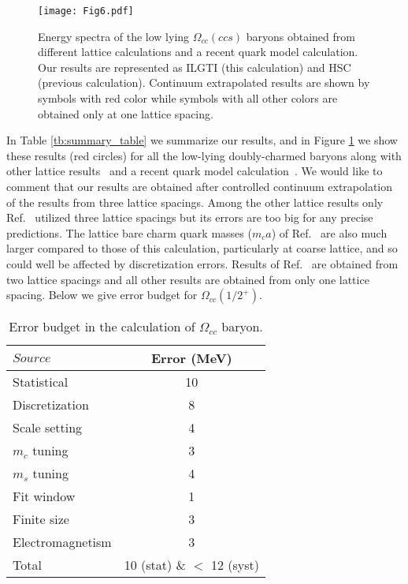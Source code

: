 \documentclass[showkeys,aps,twocolumn,showpacs,preprintnumbers,amsmath,amssymb,prl,letterpaper,floatfix,nofootinbib,superscriptaddress,]{revtex4-1}
\newcommand\bef{\begin{figure}}
\newcommand\eef[1]{\label{fg:#1}\end{figure}}
\newcommand\bet{\begin{table}}
\newcommand\eet[1]{\label{tb:#1}\end{table}}
\newcommand\fgn[1]{Figure \ref{fg:#1}}
\newcommand\tbn[1]{Table \ref{tb:#1}}
\begin{document}
{{\bef[tbh]
\centering
\texttt{[image: Fig6.pdf]}
\vspace*{-0.09in}
\caption{Energy spectra of the low lying $\Omega_{cc}(ccs)$ baryons obtained from different lattice calculations and a recent quark model calculation. Our results are represented as ILGTI (this calculation) and HSC (previous calculation). Continuum extrapolated results are shown by symbols with red color while symbols with all other colors are obtained only at one lattice spacing.}
\eef{fig_summary}

In \tbn{summary_table} we summarize our results, and in \fgn{fig_summary} we show these results (red circles) for all the low-lying doubly-charmed baryons along with other lattice results~\cite{Lewis:2001iz,Mathur:2002ce,Liu:2009jc,Briceno:2012wt,Basak:2012py,Basak:2013oya,Namekawa:2013vu,Brown:2014ena,Bali:2015lka,Padmanath:2015jea,Chen:2017kxr,Alexandrou:2017xwd,Mondal:2017nhw} and a recent quark model calculation~\cite{Karliner:2018hos}. We would like to comment that our results are obtained after controlled continuum extrapolation of the results from three lattice spacings.
 Among the other lattice results only Ref.~\cite{Briceno:2012wt} utilized three lattice spacings but its errors are too big for any precise predictions. The lattice bare charm quark masses ($m_ca$) of Ref.~\cite{Briceno:2012wt} are also much larger compared to those of this calculation, particularly at coarse lattice, and so could well be affected by discretization errors. Results of  Ref.~\cite{Brown:2014ena} are obtained from two lattice spacings and all other results are obtained from only one lattice spacing. 
Below we give error budget for $\Omega_{cc}(1/2^{+})$.
\bet[h]
\centering
\begin{tabular}{l|c }
$Source$ & Error (MeV)\\
\hline
Statistical & 10  \\
 Discretization & 8  \\
  Scale setting& 4   \\
  $m_c$ tuning & 3  \\
  $m_s$ tuning & 4 \\
  Fit window & 1 \\
  Finite size & 3 \\
  Electromagnetism & 3\\
  \hline
  Total & 10 (stat) \& $<$ 12 (syst)\\
  \hline
\end{tabular}
\caption{Error budget in the calculation of $\Omega_{cc}$ baryon.}
\eet{error_table}
 
}}
\end{document}
